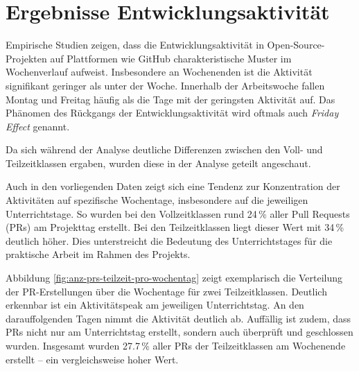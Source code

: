 \section{Ergebnisse Entwicklungsaktivität}
Empirische Studien zeigen, dass die Entwicklungsaktivität in Open-Source-Projekten auf Plattformen wie GitHub charakteristische Muster im Wochenverlauf aufweist. Insbesondere an Wochenenden ist die Aktivität signifikant geringer als unter der Woche. Innerhalb der Arbeitswoche fallen Montag und Freitag häufig als die Tage mit der geringsten Aktivität auf. Das Phänomen des Rückgangs der Entwicklungsaktivität wird oftmals auch \textit{Friday Effect} genannt. \parencite{claes_programmers_2018}

Da sich während der Analyse deutliche Differenzen zwischen den Voll- und Teilzeitklassen ergaben, wurden diese in der Analyse geteilt angeschaut. 

Auch in den vorliegenden Daten zeigt sich eine Tendenz zur Konzentration der Aktivitäten auf spezifische Wochentage, insbesondere auf die jeweiligen Unterrichtstage. So wurden bei den Vollzeitklassen rund 24\,\% aller Pull Requests (PRs) am Projekttag erstellt. Bei den Teilzeitklassen liegt dieser Wert mit 34\,\% deutlich höher. Dies unterstreicht die Bedeutung des Unterrichtstages für die praktische Arbeit im Rahmen des Projekts.

Abbildung \autoref{fig:anz-prs-teilzeit-pro-wochentag} zeigt exemplarisch die Verteilung der PR-Erstellungen über die Wochentage für zwei Teilzeitklassen. Deutlich erkennbar ist ein Aktivitätspeak am jeweiligen Unterrichtstag. An den darauffolgenden Tagen nimmt die Aktivität deutlich ab. Auffällig ist zudem, dass PRs nicht nur am Unterrichtstag erstellt, sondern auch überprüft und geschlossen wurden. Insgesamt wurden 27.7\,\% aller PRs der Teilzeitklassen am Wochenende erstellt – ein vergleichsweise hoher Wert.

